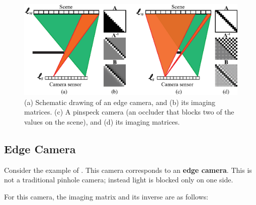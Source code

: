 \begin{figure}[t]
\centerline{
\includegraphics[width=1\linewidth]{figures/imaging/nontraditional_pinholes_2.eps}
}
\caption{(a) Schematic drawing of an edge camera, and (b) its imaging matrices. (c) A pinspeck camera (an occluder that blocks two of the values on the scene), and (d) its imaging matrices.}
\label{fig:amats3}
\end{figure}

\subsection{Edge Camera}


Consider the example of . This camera corresponds to an {\bf edge camera}. This is not a traditional pinhole camera; instead light is blocked only on one side.  




For this camera, the imaging matrix and its inverse are as follows:

